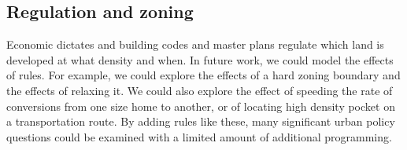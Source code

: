 
\subsection{Regulation and zoning}
Economic dictates and building codes and master plans regulate which land is developed at what density and when. In future work, we could model the effects of rules. For example, we could explore the effects of a hard zoning boundary and the effects of relaxing it. We could also explore the effect of speeding the rate of conversions from one size  home to another, or of locating high density pocket on a transportation route. By adding rules like these, many significant urban policy questions could be examined with a limited amount of additional programming. 



